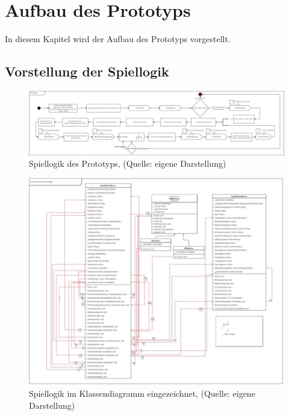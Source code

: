 \section{Aufbau des Prototyps}\label{sec:rework}
In diesem Kapitel wird der Aufbau des Prototyps vorgestellt. 

\subsection{Vorstellung der Spiellogik}\label{sec:main-game-loop}
\begin{figure}[ht]
\centering
\includegraphics[width=1\linewidth]{content/pictures/Game-Loop_Prototype.jpg}
\caption{Spiellogik des Prototyps, (Quelle: eigene Darstellung)}
\label{fig:main_game_loop}
\end{figure}

\begin{figure}[ht]
\centering
\includegraphics[width=1\linewidth]{content/pictures/Game-Loop-Class-Diagramm-Connectors.jpg}
\caption{Spiellogik im Klassendiagramm eingezeichnet, (Quelle: eigene Darstellung)}
\label{fig:main_game_loop_class_connectors}
\end{figure}

